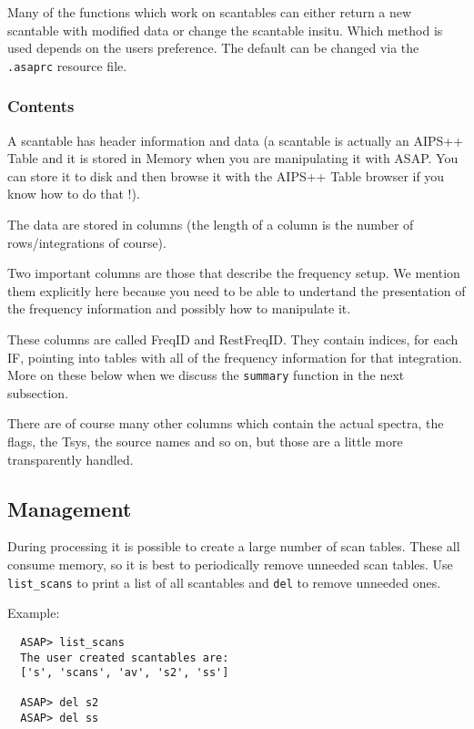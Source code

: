 \documentclass[11pt]{article}
\newcommand{\cmd}[1]{{\tt #1}}
\begin{document}
Many of the functions which work on scantables can either return a
new scantable with modified data or change the scantable insitu. Which
method is used depends on the users preference. The default can be
changed via the {\tt .asaprc} resource file.

\subsubsection {Contents}

A scantable has header information and data (a scantable is actually an AIPS++
Table and it is stored in Memory when you are manipulating it with ASAP.
You can store it to disk and then browse it with the AIPS++
Table browser if you know how to do that !).

The data are stored in columns (the length of a column is the number of
rows/integrations of course).  

Two important columns are those that describe the frequency setup.  We mention
them explicitly here because you need to be able to undertand the presentation
of the frequency information and possibly how to manipulate it.

These columns are called FreqID and RestFreqID.  They contain indices, for
each IF, pointing into tables with all of the frequency information for that
integration.   More on these below when we discuss the \cmd{summary} function
in the next subsection.

There are of course many other columns which contain the actual spectra,
the flags, the Tsys, the source names and so on, but those are a little
more transparently handled.

\subsection{Management}

During processing it is possible to create a large number of scan
tables. These all consume memory, so it is best to periodically remove
unneeded scan tables. Use \cmd{list\_scans} to print a list of all
scantables and \cmd{del} to remove unneeded ones.

Example:

\begin{verbatim}
  ASAP> list_scans
  The user created scantables are:
  ['s', 'scans', 'av', 's2', 'ss']

  ASAP> del s2   
  ASAP> del ss
\end{verbatim}
\end{document}
